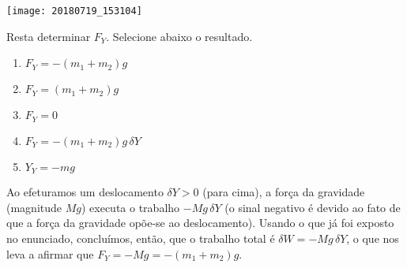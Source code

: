\begin{question}
		\begin{center}
    	\texttt{[image: 20180719\_153104]}
    \end{center}

  	Resta determinar $F_Y$.
  	Selecione abaixo o resultado.

  	\begin{enumerate}
  		\item $F_Y = -(m_1 + m_2) g$ \rightanswer
  		\item $F_Y = (m_1 + m_2) g$
  		\item $F_Y = 0$
  		\item $F_Y = -(m_1 + m_2) g\, \delta Y$
  		\item $Y_Y = -mg$
  	\end{enumerate}

    \begin{solution}
      Ao efeturamos um deslocamento $\delta Y > 0$ (para cima), a força da gravidade (magnitude $Mg$) executa o trabalho $-Mg\,\delta Y$ (o sinal negativo é devido ao fato de que a força da gravidade opõe-se ao deslocamento).
      Usando o que já foi exposto no enunciado, concluímos, então, que o trabalho total é $\delta W = -Mg\,\delta Y$, o que nos leva a afirmar que $F_Y = -Mg = -(m_1 + m_2)g$.
    \end{solution}
\end{question}